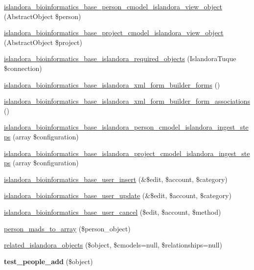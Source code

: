 \begin{DoxyCompactItemize}
\item 
\hyperlink{islandora__bioinformatics__base_8module_a28377c1d1eb3975107460a21b1900eaf}{islandora\+\_\+bioinformatics\+\_\+base\+\_\+person\+\_\+cmodel\+\_\+islandora\+\_\+view\+\_\+object} (Abstract\+Object \$person)
\item 
\hyperlink{islandora__bioinformatics__base_8module_aebd7ef53bd26dabff33c8d9ed965c355}{islandora\+\_\+bioinformatics\+\_\+base\+\_\+project\+\_\+cmodel\+\_\+islandora\+\_\+view\+\_\+object} (Abstract\+Object \$project)
\item 
\hyperlink{islandora__bioinformatics__base_8module_af49c8c4cdada468ea2f38053c815b8d0}{islandora\+\_\+bioinformatics\+\_\+base\+\_\+islandora\+\_\+required\+\_\+objects} (Islandora\+Tuque \$connection)
\item 
\hyperlink{islandora__bioinformatics__base_8module_a991861672652485988688d28b516bd2f}{islandora\+\_\+bioinformatics\+\_\+base\+\_\+islandora\+\_\+xml\+\_\+form\+\_\+builder\+\_\+forms} ()
\item 
\hyperlink{islandora__bioinformatics__base_8module_ac6e286f916e9b73cb3188ed36087132b}{islandora\+\_\+bioinformatics\+\_\+base\+\_\+islandora\+\_\+xml\+\_\+form\+\_\+builder\+\_\+form\+\_\+associations} ()
\item 
\hyperlink{islandora__bioinformatics__base_8module_aefe0d4e7b872b61e1fdf02d44dd11407}{islandora\+\_\+bioinformatics\+\_\+base\+\_\+islandora\+\_\+person\+\_\+cmodel\+\_\+islandora\+\_\+ingest\+\_\+steps} (array \$configuration)
\item 
\hyperlink{islandora__bioinformatics__base_8module_a52dced9b9bf216d349f5974cdcc0ec95}{islandora\+\_\+bioinformatics\+\_\+base\+\_\+islandora\+\_\+project\+\_\+cmodel\+\_\+islandora\+\_\+ingest\+\_\+steps} (array \$configuration)
\item 
\hyperlink{islandora__bioinformatics__base_8module_a0986c4a58fa2eed5df09ab9bdb7d6f47}{islandora\+\_\+bioinformatics\+\_\+base\+\_\+user\+\_\+insert} (\&\$edit, \$account, \$category)
\item 
\hyperlink{islandora__bioinformatics__base_8module_a1a3a11905730edcebeb2d8577756ae3e}{islandora\+\_\+bioinformatics\+\_\+base\+\_\+user\+\_\+update} (\&\$edit, \$account, \$category)
\item 
\hyperlink{islandora__bioinformatics__base_8module_aa5707478f46c88f1840a3d7e341fb5e1}{islandora\+\_\+bioinformatics\+\_\+base\+\_\+user\+\_\+cancel} (\$edit, \$account, \$method)
\item 
\hyperlink{islandora__bioinformatics__base_8module_a2d88db4e05c753b2fd28042ce12f1d12}{person\+\_\+mads\+\_\+to\+\_\+array} (\$person\+\_\+object)
\item 
\hyperlink{islandora__bioinformatics__base_8module_a1dc5e940beb7a2b30952ce00b01d388e}{related\+\_\+islandora\+\_\+objects} (\$object, \$cmodels=null, \$relationships=null)
\item 
\hypertarget{islandora__bioinformatics__base_8module_a99b5ea81575c95fda8879358c2ea0999}{{\bfseries test\+\_\+people\+\_\+add} (\$object)}\label{islandora__bioinformatics__base_8module_a99b5ea81575c95fda8879358c2ea0999}

\end{DoxyCompactItemize}
